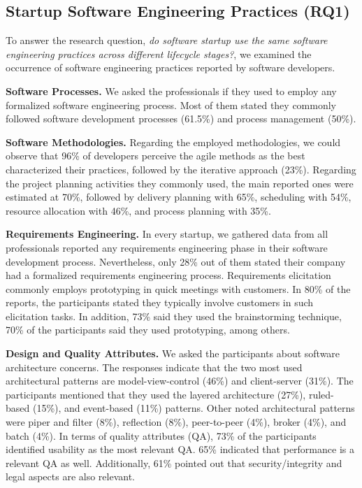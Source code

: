\documentclass[runningheads]{llncs}
\begin{document}
\subsection{Startup Software Engineering Practices (RQ1)} 
\label{section:respondingsrqs}

To answer the research question, \textit{do software startup use the same software engineering practices across different lifecycle stages?}, we examined the occurrence of software engineering practices reported by software developers. 

\textbf{Software Processes.} We asked the professionals if they used to employ any formalized software engineering process. Most of them stated they commonly followed software development processes (61.5\%) and process management (50\%). 

\textbf{Software Methodologies.} Regarding the employed methodologies, we could observe that 96\% of developers perceive the agile methods as the best characterized their practices, followed by the iterative approach (23\%). Regarding the project planning activities they commonly used, the main reported ones were estimated at 70\%, followed by delivery planning with 65\%, scheduling with 54\%, resource allocation with 46\%, and process planning with 35\%.

\textbf{Requirements Engineering.} In every startup, we gathered data from all professionals reported any requirements engineering phase in their software development process. Nevertheless, only 28\% out of them stated their company had a formalized requirements engineering process. Requirements elicitation commonly employs prototyping in quick meetings with customers. In 80\% of the reports, the participants stated they typically involve customers in such elicitation tasks. In addition, 73\% said they used the brainstorming technique, 70\% of the participants said they used prototyping, among others.

\textbf{Design and Quality Attributes.} We asked the participants about software architecture concerns. The responses indicate that the two most used architectural patterns are model-view-control (46\%) and client-server (31\%). The participants mentioned that they used the layered architecture (27\%), ruled-based (15\%), and event-based (11\%) patterns. Other noted architectural patterns were piper and filter (8\%), reflection (8\%), peer-to-peer (4\%), broker (4\%), and batch (4\%). In terms of quality attributes (QA), 73\% of the participants identified usability as the most relevant QA. 65\% indicated that performance is a relevant QA as well. Additionally, 61\% pointed out that security/integrity and legal aspects are also relevant.
\end{document}
